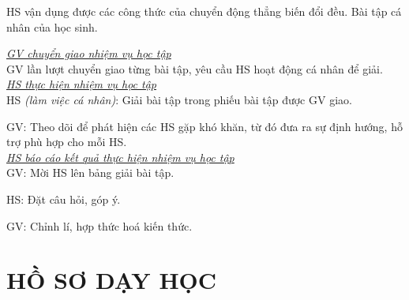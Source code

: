 {
HS vận dụng được các công thức của chuyển động thẳng biến đổi đều.
}
{
Bài tập cá nhân của học sinh.
}
{
\textit{\underline{GV chuyển giao nhiệm vụ học tập}}\\
GV lần lượt chuyển giao từng bài tập, yêu cầu HS hoạt động cá nhân để giải.\\
\textit{\underline{HS thực hiện nhiệm vụ học tập}}\\
HS \textit{(làm việc cá nhân)}:  Giải bài tập trong phiếu bài tập được GV giao. 

GV: Theo dõi để phát hiện các HS gặp khó khăn, từ đó đưa ra sự định hướng, hỗ trợ phù hợp cho mỗi HS.\\
\textit{\underline{HS báo cáo kết quả thực hiện nhiệm vụ học tập}}\\
GV: Mời HS lên bảng giải bài tập.

HS: Đặt câu hỏi, góp ý.

GV: Chỉnh lí, hợp thức hoá kiến thức.
}

\section{HỒ SƠ DẠY HỌC}
